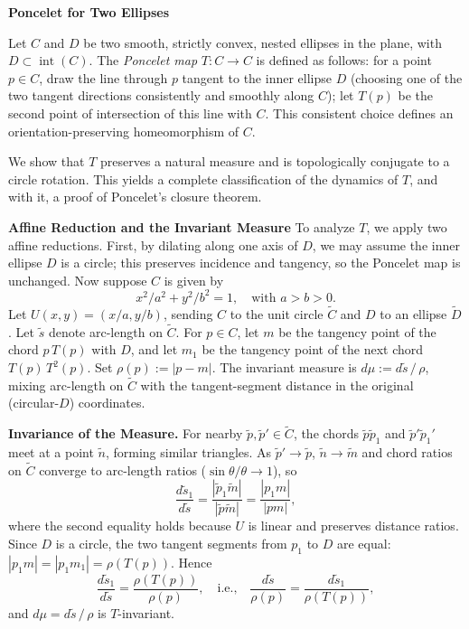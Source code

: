 \begin{technical}
  \textbf{\Large Poncelet for Two Ellipses}\vspace{0.2em}
  
  Let \( C \) and \( D \) be two smooth, strictly convex, nested ellipses in the plane, with \( D \subset \operatorname{int}(C) \). The \emph{Poncelet map } \( T: C \to C \) is defined as follows: for a point \( p \in C \), draw the line through \( p \) tangent to the inner ellipse \( D \) (choosing one of the two tangent directions consistently and smoothly along \( C \)); let \( T(p) \) be the second point of intersection of this line with \( C \). This consistent choice defines an orientation-preserving homeomorphism of \( C \).
  
  We show that \( T \) preserves a natural measure and is topologically conjugate to a circle rotation. This yields a complete classification of the dynamics of \( T \), and with it, a proof of Poncelet's closure theorem.
  
  \textbf{Affine Reduction and the Invariant Measure}
  To analyze \( T \), we apply two affine reductions. First, by dilating along one axis of \( D \), we may assume the inner ellipse \( D \) is a circle; this preserves incidence and tangency, so the Poncelet map is unchanged. Now suppose \( C \) is given by
  \[
  {x^2}/{a^2} + {y^2}/{b^2} = 1, \quad \text{with } a > b > 0.
  \]
  Let \( U(x, y) = (x/a, y/b) \), sending \( C \) to the unit circle \( \widetilde{C} \) and \( D \) to an ellipse \( \widetilde{D} \). Let \( \widetilde{s} \) denote arc-length on \( \widetilde{C} \). For \( p \in C \), let \( m \) be the tangency point of the chord \( p\,T(p) \) with \( D \), and let \( m_1 \) be the tangency point of the next chord \( T(p)\,T^2(p) \). Set \( \rho(p) := |p - m| \). The invariant measure is \( d\mu := d\widetilde{s}\,/\,\rho \), mixing arc-length on \( \widetilde{C} \) with the tangent-segment distance in the original (circular-\(D\)) coordinates.
  
  \textbf{Invariance of the Measure.} For nearby \( \widetilde{p}, \widetilde{p}' \in \widetilde{C} \), the chords \( \widetilde{p}\widetilde{p}_1 \) and \( \widetilde{p}'\widetilde{p}_1' \) meet at a point \( \widetilde{n} \), forming similar triangles. As \( \widetilde{p}' \to \widetilde{p} \), \( \widetilde{n} \to \widetilde{m} \) and chord ratios on \( \widetilde{C} \) converge to arc-length ratios (\( \sin\theta/\theta \to 1 \)), so
  \[
  \frac{d\widetilde{s}_1}{d\widetilde{s}} = \frac{|\widetilde{p}_1\widetilde{m}|}{|\widetilde{p}\widetilde{m}|} = \frac{|p_1 m|}{|pm|},
  \]
  where the second equality holds because \( U \) is linear and preserves distance ratios. Since \( D \) is a circle, the two tangent segments from \( p_1 \) to \( D \) are equal: \( |p_1 m| = |p_1 m_1| = \rho(T(p)) \). Hence
  \[
  \frac{d\widetilde{s}_1}{d\widetilde{s}} = \frac{\rho(T(p))}{\rho(p)}, \quad \text{i.e.,} \quad \frac{d\widetilde{s}}{\rho(p)} = \frac{d\widetilde{s}_1}{\rho(T(p))},
  \]
  and \( d\mu = d\widetilde{s}\,/\,\rho \) is \( T \)-invariant.
  

\end{technical}
